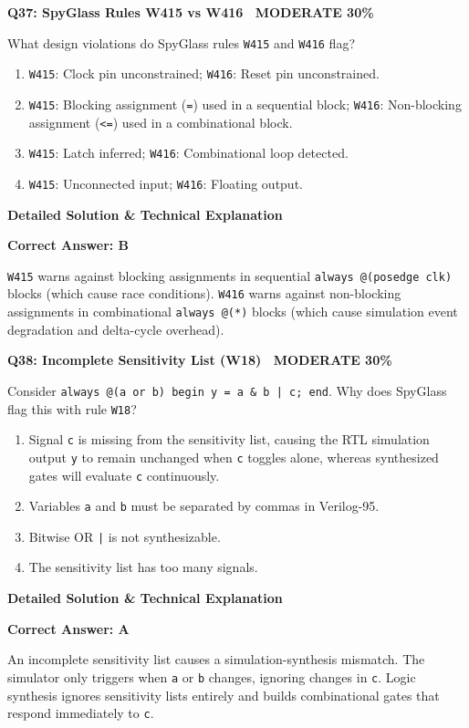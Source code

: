 \documentclass[11pt,a4paper]{article}
\newcommand{\badgemod}{{\color{white}\colorbox{modoran}{\bfseries\sffamily\tiny\ MODERATE 30\%\ }}}
\newenvironment{qbox}[2]{%
  \begin{mdframed}[style=qstyle]%
  {\bfseries\sffamily\color{primaryblue}#1 \hfill #2}\par\vspace{2pt}%
}{%
  \end{mdframed}%
}
\newenvironment{ansbox}{%
  \begin{mdframed}[style=ansstyle]%
  {\bfseries\sffamily\color{ansgreen}\small Detailed Solution \& Technical Explanation}\par\vspace{2pt}\small%
}{%
  \end{mdframed}%
}
\begin{document}
\begin{qbox}{Q37: SpyGlass Rules W415 vs W416}{\badgemod}
What design violations do SpyGlass rules \texttt{W415} and \texttt{W416} flag?
\begin{enumerate}[label=\textbf{\Alph*.}]
  \item \texttt{W415}: Clock pin unconstrained; \texttt{W416}: Reset pin unconstrained.
  \item \texttt{W415}: Blocking assignment (\texttt{=}) used in a sequential block; \texttt{W416}: Non-blocking assignment (\texttt{<=}) used in a combinational block.
  \item \texttt{W415}: Latch inferred; \texttt{W416}: Combinational loop detected.
  \item \texttt{W415}: Unconnected input; \texttt{W416}: Floating output.
\end{enumerate}
\end{qbox}
\begin{ansbox}
\textbf{Correct Answer: B}

\texttt{W415} warns against blocking assignments in sequential \texttt{always @(posedge clk)} blocks (which cause race conditions). \texttt{W416} warns against non-blocking assignments in combinational \texttt{always @(*)} blocks (which cause simulation event degradation and delta-cycle overhead).
\end{ansbox}

\begin{qbox}{Q38: Incomplete Sensitivity List (W18)}{\badgemod}
Consider \texttt{always @(a or b) begin y = a \& b | c; end}. Why does SpyGlass flag this with rule \texttt{W18}?
\begin{enumerate}[label=\textbf{\Alph*.}]
  \item Signal \texttt{c} is missing from the sensitivity list, causing the RTL simulation output \texttt{y} to remain unchanged when \texttt{c} toggles alone, whereas synthesized gates will evaluate \texttt{c} continuously.
  \item Variables \texttt{a} and \texttt{b} must be separated by commas in Verilog-95.
  \item Bitwise OR \texttt{|} is not synthesizable.
  \item The sensitivity list has too many signals.
\end{enumerate}
\end{qbox}
\begin{ansbox}
\textbf{Correct Answer: A}

An incomplete sensitivity list causes a simulation-synthesis mismatch. The simulator only triggers when \texttt{a} or \texttt{b} changes, ignoring changes in \texttt{c}. Logic synthesis ignores sensitivity lists entirely and builds combinational gates that respond immediately to \texttt{c}.
\end{ansbox}
\end{document}
